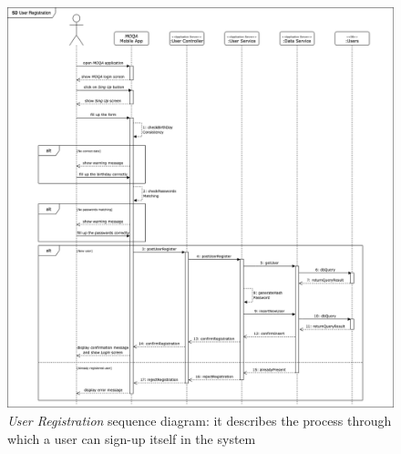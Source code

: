 \begin{figure}[H]
\begin{center}
  \includegraphics[width=\textwidth,keepaspectratio]{img/archi/sequences/signup.png}
  \hspace{0.05\linewidth}
  \centering
  \caption{\textit{User Registration} sequence diagram: it describes the process through which a user can sign-up itself in the system}
  \label{img:archi_sequence1}
\end{center}
\end{figure}

